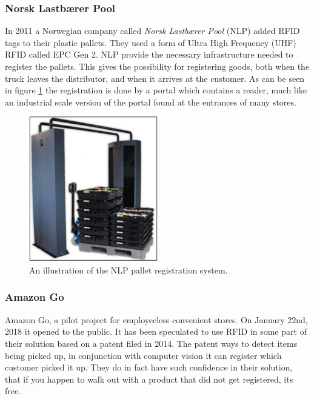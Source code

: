 \subsubsection{Norsk Lastbærer Pool}
In 2011 a Norwegian company called \textit{Norsk Lastbærer Pool} (NLP) added RFID tags to their plastic  pallets. \cite{swedberg2011norsk} They used a form of Ultra High Frequency (UHF) RFID called EPC Gen 2. \cite{roberti2004epcglobal} NLP provide the necessary infrastructure needed to register the pallets. This gives the possibility for registering goods, both when the truck leaves the distributor, and when it arrives at the customer. As can be seen in figure \ref{fig:02:NLP} the registration is done by a portal which contains a reader, much like an industrial scale version of the portal found at the entrances of many stores.
\begin{figure}[H]
    \centering
    \includegraphics[width=0.5\textwidth]{02_Literature_study/figures/NLP.png}
    \caption{An illustration of the NLP pallet registration system. \cite{swedberg2011norsk}}
    \label{fig:02:NLP}
\end{figure}


\subsubsection{Amazon Go}
Amazon Go, a pilot project for employeeless convenient stores. On January 22nd, 2018 it opened to the public. \cite{bosa_salinas_2018} It has been speculated to use RFID in some part of their solution based on a patent filed in 2014. \cite{AmazonGo} The patent ways to detect items being picked up, in conjunction with computer vision it can register which customer picked it up. They do in fact have such confidence in their solution, that if you happen to walk out with a product that did not get registered, its free. \cite{bosa_salinas_2018} 

